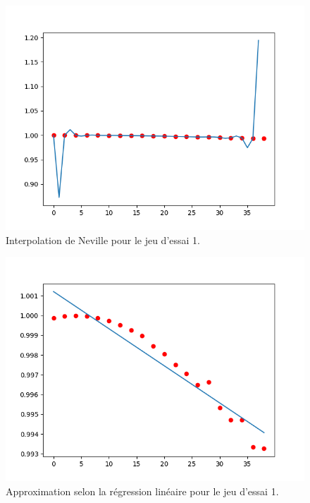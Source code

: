 \documentclass[12pt,french,titlepage]{article}
\begin{document}
		\begin{figure}[H]
		\includegraphics[width=\textwidth]{"12.png"}
		\caption{Interpolation de Neville pour le jeu d'essai 1.}
		\end{figure}
		
		\begin{figure}[H]
		\includegraphics[width=\textwidth]{"13.png"}
		\caption{Approximation selon la régression linéaire pour le jeu d'essai 1.}
		\end{figure}
\end{document}
